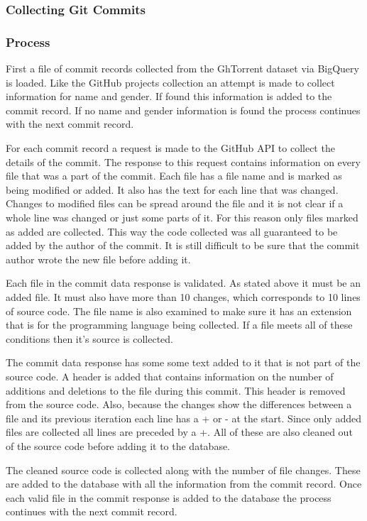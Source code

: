 \documentclass{article}
\begin{document}
\subsubsection{Collecting Git Commits}

\subsubsection*{Process}
First a file of commit records collected from the GhTorrent dataset via BigQuery is loaded. Like the GitHub projects collection an attempt is made to collect information for name and gender. If found this information is added to the commit record. If no name and gender information is found the process continues with the next commit record.

For each commit record a request is made to the GitHub API to collect the details of the commit. The response to this request contains information on every file that was a part of the commit. Each file has a file name and is marked as being modified or added. It also has the text for each line that was changed. Changes to modified files can be spread around the file and it is not clear if a whole line was changed or just some parts of it. For this reason only files marked as added are collected. This way the code collected was all guaranteed to be added by the author of the commit. It is still difficult to be sure that the commit author wrote the new file before adding it.

Each file in the commit data response is validated. As stated above it must be an added file. It must also have more than 10 changes, which corresponds to 10 lines of source code. The file name is also examined to make sure it has an extension that is for the programming language being collected. If a file meets all of these conditions then it's source is collected.

The commit data response has some some text added to it that is not part of the source code. A header is added that contains information on the number of additions and deletions to the file during this commit. This header is removed from the source code. Also, because the changes show the differences between a file and its previous iteration each line has a + or - at the start. Since only added files are collected all lines are preceded by a +. All of these are also cleaned out of the source code before adding it to the database.

The cleaned source code is collected along with the number of file changes. These are added to the database with all the information from the commit record.
Once each valid file in the commit response is added to the database the process continues with the next commit record.
\end{document}
